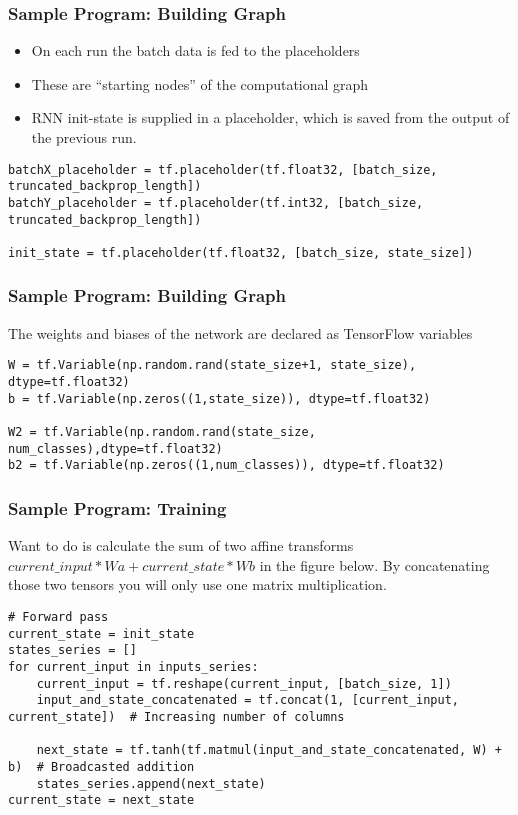 \begin{frame}[fragile] \frametitle{Sample Program: Building Graph}

\begin{itemize}
\item On each run the batch data is fed to the placeholders
\item These are ``starting nodes'' of the computational graph
\item  RNN init-state is supplied in a placeholder, which is saved from the output of the previous run. 
\end{itemize}

\begin{lstlisting}
batchX_placeholder = tf.placeholder(tf.float32, [batch_size, truncated_backprop_length])
batchY_placeholder = tf.placeholder(tf.int32, [batch_size, truncated_backprop_length])

init_state = tf.placeholder(tf.float32, [batch_size, state_size])
\end{lstlisting}
 
\end{frame}

\begin{frame}[fragile] \frametitle{Sample Program: Building Graph}

The weights and biases of the network are declared as TensorFlow variables

\begin{lstlisting}
W = tf.Variable(np.random.rand(state_size+1, state_size), dtype=tf.float32)
b = tf.Variable(np.zeros((1,state_size)), dtype=tf.float32)

W2 = tf.Variable(np.random.rand(state_size, num_classes),dtype=tf.float32)
b2 = tf.Variable(np.zeros((1,num_classes)), dtype=tf.float32)
\end{lstlisting}
 
\end{frame}


\begin{frame}[fragile] \frametitle{Sample Program: Training}

Want to do is calculate the sum of two affine transforms $current\_input * Wa + current\_state * Wb$ in the figure below. By concatenating those two tensors you will only use one matrix multiplication.

\begin{lstlisting}
# Forward pass
current_state = init_state
states_series = []
for current_input in inputs_series:
    current_input = tf.reshape(current_input, [batch_size, 1])
    input_and_state_concatenated = tf.concat(1, [current_input, current_state])  # Increasing number of columns

    next_state = tf.tanh(tf.matmul(input_and_state_concatenated, W) + b)  # Broadcasted addition
    states_series.append(next_state)
current_state = next_state
\end{lstlisting}
 \end{frame}



